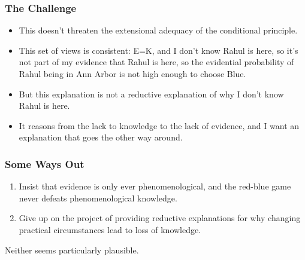 \begin{frame}

\frametitle{The Challenge}
\label{thechallenge}

\begin{itemize}
\item This doesn't threaten the extensional adequacy of the conditional principle.

\item This set of views is consistent: E=K, and I don't know Rahul is here, so it's not part of my evidence that Rahul is here, so the evidential probability of Rahul being in Ann Arbor is not high enough to choose Blue.

\item But this explanation is not a reductive explanation of why I don't know Rahul is here.

\item It reasons from the lack to knowledge to the lack of evidence, and I want an explanation that goes the other way around.

\end{itemize}

\end{frame}

\begin{frame}

\frametitle{Some Ways Out}
\label{somewaysout}

\begin{enumerate}
\item Insist that evidence is only ever phenomenological, and the red-blue game never defeats phenomenological knowledge.

\item Give up on the project of providing reductive explanations for why changing practical circumstances lead to loss of knowledge.

\end{enumerate}

Neither seems particularly plausible.

\end{frame}


